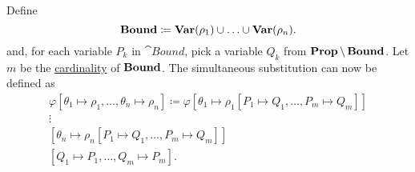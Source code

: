 \begin{definition}
\begin{thmenum}
    Define
    \begin{equation*}
      \operatorname{\mathbf{Bound}} \coloneqq \operatorname{\mathbf{Var}}(\rho_1) \cup \ldots \cup \operatorname{\mathbf{Var}}(\rho_n).
    \end{equation*}
    and, for each variable \( P_k \) in \( \cat{Bound} \), pick a variable \( Q_k \) from \( \operatorname{\mathbf{Prop}} \setminus \operatorname{\mathbf{Bound}} \). Let \( m \) be the \hyperref[def:cardinal]{cardinality} of \( \operatorname{\mathbf{Bound}} \). The simultaneous substitution can now be defined as
    \begin{align*}
      \varphi[\theta_1 \mapsto \rho_1, \ldots, \theta_n \mapsto \rho_n] \coloneqq \varphi
      [\theta_1 \mapsto \rho_1[P_1 \mapsto Q_1, \ldots, P_m \mapsto Q_m]] \\
      \vdots \hspace{3cm} \\
      [\theta_n \mapsto \rho_n[P_1 \mapsto Q_1, \ldots, P_m \mapsto Q_m]] \\
      [Q_1 \mapsto P_1, \ldots, Q_m \mapsto P_m].
    \end{align*}
  \end{thmenum}
\end{definition}

